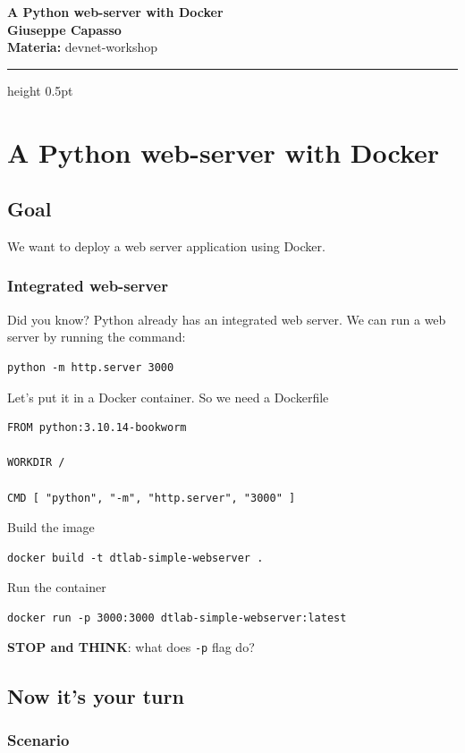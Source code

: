 \documentclass[11pt,a4paper]{article}
\newcommand{\proposaltitle}[1]{
    \begin{center}
        \vspace*{0.1cm}
        {\LARGE \bfseries \color{blue} #1} \\[1.5ex]
        {\large \textbf{Giuseppe Capasso}} \\[1ex]
                \small{
            \vspace{0.1cm}
            \textbf{Materia:} devnet-workshop\\
        }
            \end{center}
    \vspace{0.3cm}
    \hrule height 0.5pt
    \vspace{0.5cm}
}
\begin{document}
\proposaltitle{A Python web-server with Docker}

\section{A Python web-server with
Docker}\label{a-python-web-server-with-docker}

\subsection{Goal}\label{goal}

We want to deploy a web server application using Docker.

\subsubsection{Integrated web-server}\label{integrated-web-server}

Did you know? Python already has an integrated web server. We can run a
web server by running the command:

\begin{verbatim}
python -m http.server 3000
\end{verbatim}

Let's put it in a Docker container. So we need a Dockerfile

\begin{verbatim}
FROM python:3.10.14-bookworm

WORKDIR /

CMD [ "python", "-m", "http.server", "3000" ]
\end{verbatim}

Build the image

\begin{verbatim}
docker build -t dtlab-simple-webserver .
\end{verbatim}

Run the container

\begin{verbatim}
docker run -p 3000:3000 dtlab-simple-webserver:latest
\end{verbatim}

\textbf{STOP and THINK}: what does \texttt{-p} flag do?

\subsection{Now it's your turn}\label{now-its-your-turn}

\subsubsection{Scenario}\label{scenario}
\end{document}
